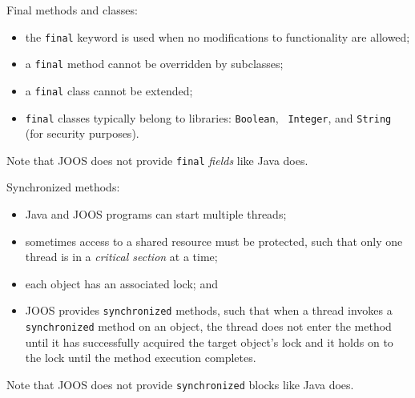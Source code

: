 \begin{slide*}
Final methods and classes:
\begin{itemize}
\item the {\tt final} keyword is used when no modifications to functionality are allowed;
\item a {\tt final} method cannot be overridden by subclasses;
\item a {\tt final} class cannot be extended;
\item {\tt final} classes typically belong to libraries: {\tt Boolean}, {\tt
Integer}, and {\tt String} (for security purposes).
\end{itemize}

\vspace{0.1in}

Note that JOOS does not provide {\tt final} {\em fields} like Java does.

\vfil
\end{slide*}

\begin{slide*}
Synchronized methods:

\begin{itemize}
\item Java and JOOS programs can start multiple threads;
\item sometimes access to a shared resource must be protected, such
  that only one thread is in a {\em critical section} at a time;
\item each object has an associated lock; and
\item JOOS provides {\tt synchronized} methods, such that when a thread invokes a {\tt synchronized}
          method on an object, the thread does not enter the method
          until it has successfully acquired the target object's lock
          and it holds on to the lock until the method execution completes.
\end{itemize}

\vspace{0.1in}

Note that JOOS does not provide {\tt synchronized} blocks like Java does.

\vfil
\end{slide*}

